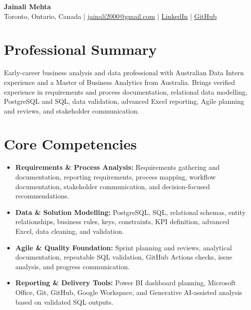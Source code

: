 \documentclass[letterpaper,10pt]{article}
\begin{document}
\begin{center}
  {\fontsize{17}{19}\selectfont\textbf{Jainali Mehta}}\\[2pt]
  \small Toronto, Ontario, Canada \;|\;
  \href{mailto:jainali2000@gmail.com}{jainali2000@gmail.com} \;|\;
  \href{https://www.linkedin.com/in/jainali-mehta}{LinkedIn} \;|\;
  \href{https://github.com/jainalimehta}{GitHub}
\end{center}
\vspace{-7pt}

\section{Professional Summary}
\small Early-career business analysis and data professional with Australian Data Intern experience and a Master of Business Analytics from Australia. Brings verified experience in requirements and process documentation, relational data modelling, PostgreSQL and SQL, data validation, advanced Excel reporting, Agile planning and reviews, and stakeholder communication.

\section{Core Competencies}
\begin{itemize}[leftmargin=0.16in,label=\textbullet,topsep=0pt,itemsep=1pt,parsep=0pt]
  \item \small \textbf{Requirements \& Process Analysis:} Requirements gathering and documentation, reporting requirements, process mapping, workflow documentation, stakeholder communication, and decision-focused recommendations.
  \item \small \textbf{Data \& Solution Modelling:} PostgreSQL, SQL, relational schemas, entity relationships, business rules, keys, constraints, KPI definition, advanced Excel, data cleaning, and validation.
  \item \small \textbf{Agile \& Quality Foundation:} Sprint planning and reviews, analytical documentation, repeatable SQL validation, GitHub Actions checks, issue analysis, and progress communication.
  \item \small \textbf{Reporting \& Delivery Tools:} Power BI dashboard planning, Microsoft Office, Git, GitHub, Google Workspace, and Generative AI-assisted analysis based on validated SQL outputs.
\end{itemize}
\end{document}
